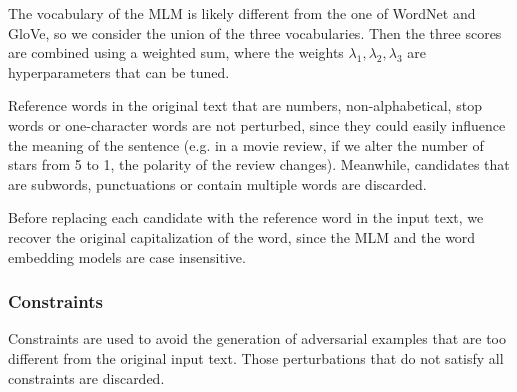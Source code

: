 The vocabulary of the MLM is likely different from the one of WordNet and GloVe, so we consider the union of the three vocabularies.
Then the three scores are combined using a weighted sum, where the weights $\lambda_1, \lambda_2, \lambda_3$ are hyperparameters that can be tuned.

Reference words in the original text that are numbers, non-alphabetical, stop words or one-character words are not perturbed, since they could easily influence the meaning of the sentence (e.g. in a movie review, if we alter the number of stars from 5 to 1, the polarity of the review changes).
Meanwhile, candidates that are subwords, punctuations or contain multiple words are discarded.

Before replacing each candidate with the reference word in the input text, we recover the original capitalization of the word, since the MLM and the word embedding models are case insensitive.




\subsubsection{Constraints}\label{subsubsec:constraints}

Constraints are used to avoid the generation of adversarial examples that are too different from the original input text.
Those perturbations that do not satisfy all constraints are discarded.

